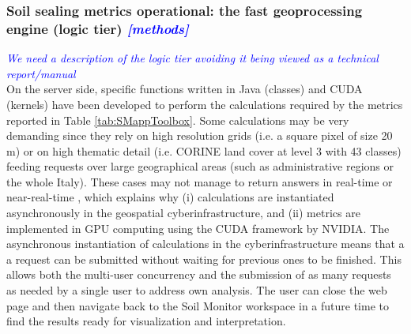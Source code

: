 \documentclass[APA,LATO1COL,doublespace]{WileyNJD-v2}
\newcommand{\update}[1]{\emph{\textcolor{blue}{#1}}}     %
\begin{document}
\subsubsection{ Soil sealing metrics operational: the fast geoprocessing engine (logic tier) \update{[methods]} }
\label{sec:logicTier}
\update{We need a description of the logic tier avoiding it being viewed as a technical report/manual}\\
On the server side, specific functions written in Java (classes) and CUDA (kernels) have been developed to perform the calculations required by the metrics reported in Table \ref{tab:SMappToolbox}. 
Some calculations may be very demanding since they rely on high resolution grids (i.e. a square pixel of size 20 m) or on high thematic detail (i.e. CORINE land cover at level 3 with 43 classes) feeding requests over large geographical areas (such as administrative regions or the whole Italy).
These cases may not manage to return answers in real-time or near-real-time
, which explains why 
(i) calculations are instantiated asynchronously in the geospatial cyberinfrastructure, and
(ii) metrics are implemented in GPU computing using the CUDA framework by NVIDIA.
The asynchronous instantiation of calculations in the cyberinfrastructure means that a a request can be submitted without waiting for previous ones to be finished.
This allows both the multi-user concurrency and the submission of as many requests as needed by a single user to address own analysis.
The user can close the web page and then navigate back to the Soil Monitor workspace in a future time to find the results ready for visualization and interpretation.
\end{document}
